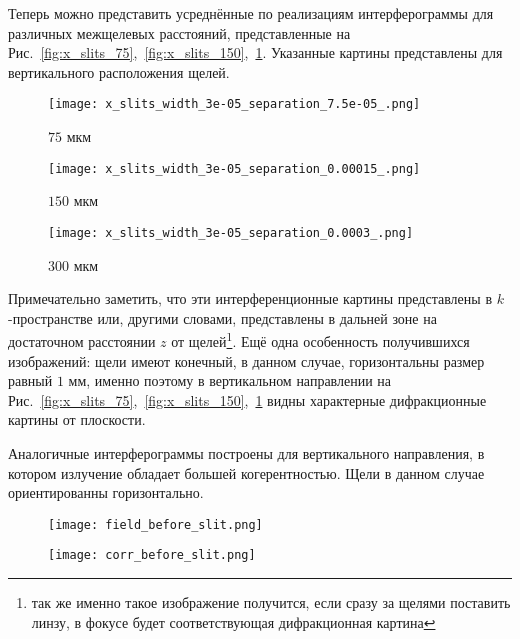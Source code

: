 Теперь можно представить усреднённые по реализациям интерферограммы для различных межщелевых расстояний, представленные на Рис.~\ref{fig:x_slits_75},~\ref{fig:x_slits_150},~\ref{fig:x_slits_300}. Указанные картины представлены для вертикального расположения щелей.
\begin{figure}[H]
	\centering
	\begin{minipage}{0.33\textwidth}
		\centering
		\texttt{[image: x\_slits\_width\_3e-05\_separation\_7.5e-05\_.png]}
		\caption{$75$ мкм}
		\label{fig:x_slits_75}
	\end{minipage}
	\begin{minipage}{0.33\textwidth}
		\centering
		\texttt{[image: x\_slits\_width\_3e-05\_separation\_0.00015\_.png]}
		\caption{$150$ мкм}
		\label{fig:x_slits_150}
	\end{minipage}\hfill
	\begin{minipage}{0.33\textwidth}
		\centering
		\texttt{[image: x\_slits\_width\_3e-05\_separation\_0.0003\_.png]}
		\caption{$300$ мкм}
		\label{fig:x_slits_300}
	\end{minipage}\hfill
\end{figure}
Примечательно заметить, что эти интерференционные картины представлены в $k$-пространстве или, другими словами, представлены в дальней зоне на достаточном расстоянии $z$ от щелей\footnote{так же именно такое изображение получится, если сразу за щелями поставить линзу, в фокусе будет соответствующая дифракционная картина}. Ещё одна особенность получившихся изображений: щели имеют конечный, в данном случае, горизонтальны размер равный $1$ мм, именно поэтому в вертикальном направлении на Рис.~\ref{fig:x_slits_75},~\ref{fig:x_slits_150},~\ref{fig:x_slits_300} видны характерные дифракционные картины от плоскости.

Аналогичные интерферограммы построены для вертикального направления, в котором излучение обладает большей когерентностью. Щели в данном случае ориентированны горизонтально.
\begin{figure}[H]
	\centering
	\begin{minipage}{0.33\textwidth}
		\centering
		\texttt{[image: field\_before\_slit.png]}
		\caption{}
		\label{fig:y_field_before_slit}
	\end{minipage}
	\begin{minipage}{0.33\textwidth}
		\centering
		\texttt{[image: corr\_before\_slit.png]}
		\caption{}
		\label{fig:y_corr_before_slit}
	\end{minipage}\hfill
\end{figure}

